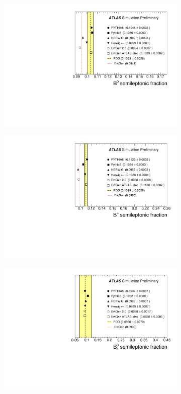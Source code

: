 \begin{figure}
\centering
\begin{subfigure}[]{0.45\textwidth}
\includegraphics[width=\textwidth]{evtgen/figures/EvtGen/h_B0_sl.pdf}
\end{subfigure}
\begin{subfigure}[]{0.45\textwidth}
\includegraphics[width=\textwidth]{evtgen/figures/EvtGen/h_B_sl.pdf}
\end{subfigure}
\begin{subfigure}[]{0.45\textwidth}
\includegraphics[width=\textwidth]{evtgen/figures/EvtGen/h_Bs_sl.pdf}

\end{subfigure}
\end{figure}
